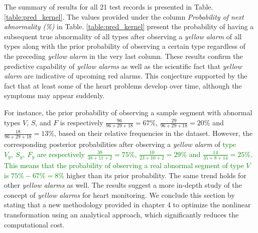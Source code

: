 The summary of results for all 21 test records is presented in Table. \ref{table:pred_kernel}. The values provided under the column \textit{Probability of next abnormality (\%)} in Table. \ref{table:pred_kernel} present the probability of having a subsequent true abnormality of all types after observing a \textit{yellow alarm} of all types along with the prior probability of observing a certain type regardless of the preceding \textit{yellow alarm} in the very last column. %
These results confirm the predictive capability of \textit{yellow alarms} as well as the scientific fact that \textit{yellow alarm} are indicative of upcoming red alarms. This conjecture supported by the fact that at least some of the heart problems develop over time, although the symptoms may appear suddenly. 
 
For instance, the prior probability of observing a sample segment with abnormal types $V$, $S$, and $F$ is respectively $\frac{96}{96+29+18}=67\%$, $\frac{29}{96+29+18}=20\%$ and $\frac{18}{96+29+18}=13\%$, based on their relative frequencies in the dataset. However, the corresponding posterior probabilities after observing a \textit{yellow alarm} of \textcolor{green}{type $V_y,~S_y,~F_y$ are respectively $\frac{38}{38+11+2}=75\%$, $\frac{10}{23+10+2}=29\%$ and $\frac{14}{35+8+14}=25\%$. This means that the probability of observing a real abnormal segment of type $V$ is $75\%-67\%=8\%$} higher than its prior probability. The same trend holds for other \textit{yellow alarms} as well. The results suggest a more in-depth study of the concept of \textit{yellow alarms} for heart monitoring. 
We conclude this section by stating that a new methodology provided in chapter 4 to optimize the nonlinear transformation using an analytical approach, which significantly reduces the computational cost.

